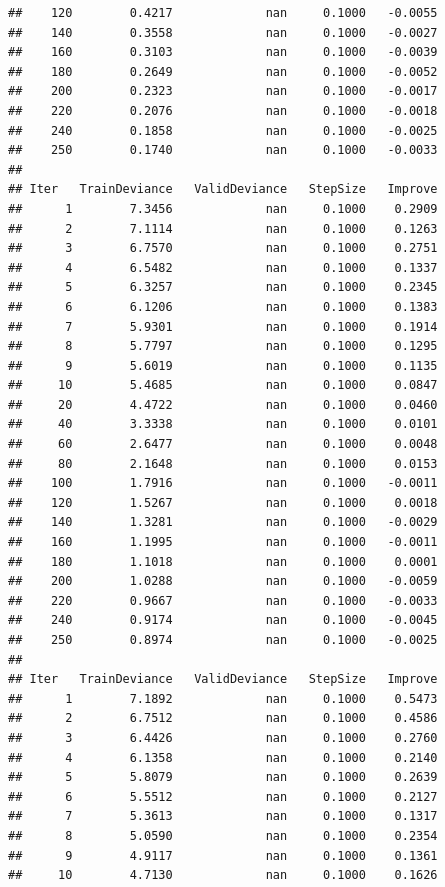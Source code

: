 \documentclass[
]{book}
\begin{document}
\begin{verbatim}
##    120        0.4217             nan     0.1000   -0.0055
##    140        0.3558             nan     0.1000   -0.0027
##    160        0.3103             nan     0.1000   -0.0039
##    180        0.2649             nan     0.1000   -0.0052
##    200        0.2323             nan     0.1000   -0.0017
##    220        0.2076             nan     0.1000   -0.0018
##    240        0.1858             nan     0.1000   -0.0025
##    250        0.1740             nan     0.1000   -0.0033
## 
## Iter   TrainDeviance   ValidDeviance   StepSize   Improve
##      1        7.3456             nan     0.1000    0.2909
##      2        7.1114             nan     0.1000    0.1263
##      3        6.7570             nan     0.1000    0.2751
##      4        6.5482             nan     0.1000    0.1337
##      5        6.3257             nan     0.1000    0.2345
##      6        6.1206             nan     0.1000    0.1383
##      7        5.9301             nan     0.1000    0.1914
##      8        5.7797             nan     0.1000    0.1295
##      9        5.6019             nan     0.1000    0.1135
##     10        5.4685             nan     0.1000    0.0847
##     20        4.4722             nan     0.1000    0.0460
##     40        3.3338             nan     0.1000    0.0101
##     60        2.6477             nan     0.1000    0.0048
##     80        2.1648             nan     0.1000    0.0153
##    100        1.7916             nan     0.1000   -0.0011
##    120        1.5267             nan     0.1000    0.0018
##    140        1.3281             nan     0.1000   -0.0029
##    160        1.1995             nan     0.1000   -0.0011
##    180        1.1018             nan     0.1000    0.0001
##    200        1.0288             nan     0.1000   -0.0059
##    220        0.9667             nan     0.1000   -0.0033
##    240        0.9174             nan     0.1000   -0.0045
##    250        0.8974             nan     0.1000   -0.0025
## 
## Iter   TrainDeviance   ValidDeviance   StepSize   Improve
##      1        7.1892             nan     0.1000    0.5473
##      2        6.7512             nan     0.1000    0.4586
##      3        6.4426             nan     0.1000    0.2760
##      4        6.1358             nan     0.1000    0.2140
##      5        5.8079             nan     0.1000    0.2639
##      6        5.5512             nan     0.1000    0.2127
##      7        5.3613             nan     0.1000    0.1317
##      8        5.0590             nan     0.1000    0.2354
##      9        4.9117             nan     0.1000    0.1361
##     10        4.7130             nan     0.1000    0.1626

\end{verbatim}
\end{document}
